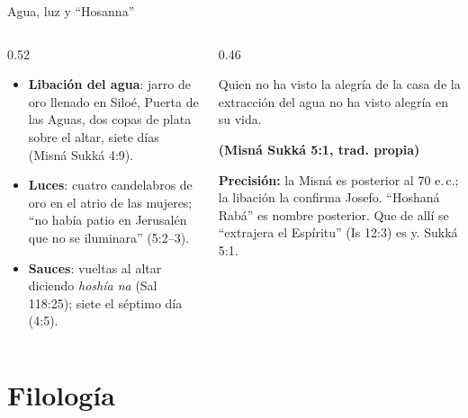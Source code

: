 \documentclass[hyperref={bookmarks=false},aspectratio=169]{beamer}
\newcommand{\fuente}[1]{\par\hfill{\upshape\bfseries\footnotesize\textcolor{tierraroja}{#1}}}
\newcommand{\precision}[1]{{\footnotesize\color{sepia}\textbf{Precisión:} #1}}
\begin{document}
\begin{frame}{Agua, luz y ``Hosanna''}
\begin{columns}[t,onlytextwidth]
\begin{column}{0.52\textwidth}\scriptsize
\begin{itemize}
\item \textbf{Libación del agua}: jarro de oro llenado en Siloé, Puerta de las Aguas, dos copas de plata sobre el altar, siete días (Misná Sukká 4:9).
\item \textbf{Luces}: cuatro candelabros de oro en el atrio de las mujeres; ``no había patio en Jerusalén que no se iluminara'' (5:2--3).
\item \textbf{Sauces}: vueltas al altar diciendo \emph{hoshía na} (Sal 118:25); siete el séptimo día (4:5).
\end{itemize}
\end{column}
\begin{column}{0.46\textwidth}
\begin{cita}Quien no ha visto la alegría de la casa de la extracción del agua no ha visto alegría en su vida.\fuente{(Misná Sukká 5:1, trad. propia)}\end{cita}
\precision{la Misná es posterior al 70 e.\,c.; la libación la confirma Josefo. ``Hoshaná Rabá'' es nombre posterior. Que de allí se ``extrajera el Espíritu'' (Is 12:3) es y. Sukká 5:1.}
\end{column}
\end{columns}
\end{frame}

\section{Filología}
\end{document}
